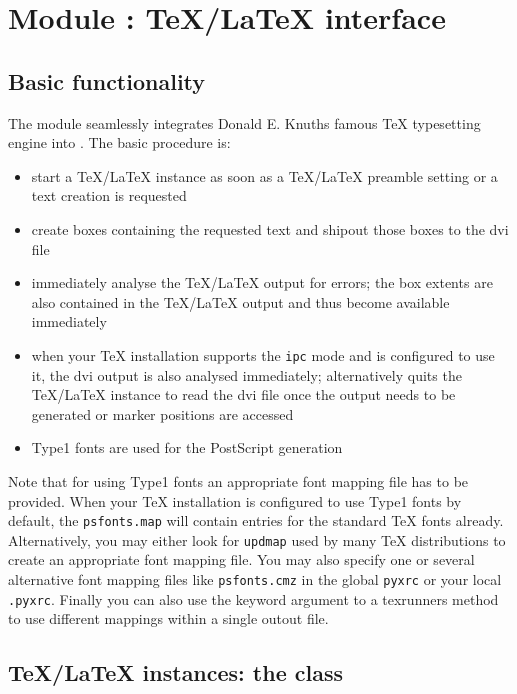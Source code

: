 \chapter[Module \module{text}: TeX/LaTeX interface]{Module : \TeX/\LaTeX{} interface}
\label{module:text}

\section{Basic functionality}

The  module seamlessly integrates Donald E. Knuths famous
\TeX{} typesetting engine into \PyX. The basic procedure is:
\begin{itemize}
\item start a \TeX/\LaTeX{} instance as soon as a \TeX/\LaTeX{}
preamble setting or a text creation is requested
\item create boxes containing the requested text and shipout those
boxes to the dvi file
\item immediately analyse the \TeX/\LaTeX{} output for errors; the box
extents are also contained in the \TeX/\LaTeX{} output and thus become
available immediately
\item when your TeX installation supports the \texttt{ipc} mode and
\PyX{} is configured to use it, the dvi output is also analysed
immediately; alternatively \PyX{} quits the \TeX/\LaTeX{} instance to
read the dvi file once the output needs to be generated or marker
positions are accessed
\item Type1 fonts are used for the PostScript generation
\end{itemize}

Note that for using Type1 fonts an appropriate font mapping file has
to be provided. When your \TeX{} installation is configured to use
Type1 fonts by default, the \texttt{psfonts.map} will contain entries
for the standard \TeX{} fonts already. Alternatively, you may either
look for \texttt{updmap} used by many \TeX{} distributions to create
an appropriate font mapping file. You may also specify one or several
alternative font mapping files like \texttt{psfonts.cmz} in the global
\texttt{pyxrc} or your local \texttt{.pyxrc}. Finally you can also use
the  keyword argument to a texrunners 
method to use different mappings within a single outout file.

\section[TeX/LaTeX instances: the \class{texrunner} class]%
{\TeX/\LaTeX{} instances: the  class}

